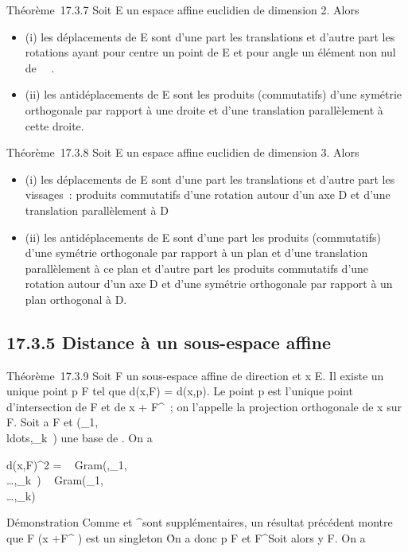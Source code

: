 \documentclass[]{article}
\begin{document}
Théorème~17.3.7 Soit E un espace affine euclidien de dimension 2. Alors

\begin{itemize}
\itemsep1pt\parskip0pt
\item
  (i) les déplacements de E sont d'une part les translations et d'autre
  part les rotations ayant pour centre un point de E et pour angle un
  élément non nul de ~\pi~.
\item
  (ii) les antidéplacements de E sont les produits (commutatifs) d'une
  symétrie orthogonale par rapport à une droite et d'une translation
  parallèlement à cette droite.
\end{itemize}

Théorème~17.3.8 Soit E un espace affine euclidien de dimension 3. Alors

\begin{itemize}
\itemsep1pt\parskip0pt
\item
  (i) les déplacements de E sont d'une part les translations et d'autre
  part les vissages~: produits commutatifs d'une rotation autour d'un
  axe D et d'une translation parallèlement à D
\item
  (ii) les antidéplacements de E sont d'une part les produits
  (commutatifs) d'une symétrie orthogonale par rapport à un plan et
  d'une translation parallèlement à ce plan et d'autre part les produits
  commutatifs d'une rotation autour d'un axe D et d'une symétrie
  orthogonale par rapport à un plan orthogonal à D.
\end{itemize}

\subsection{17.3.5 Distance à un sous-espace affine}

Théorème~17.3.9 Soit F un sous-espace affine de direction
\overrightarrowF et x \in E. Il existe un unique point
p \in F tel que d(x,F) = d(x,p). Le point p est l'unique point
d'intersection de F et de x +\overrightarrow
F^\bot~; on l'appelle la projection orthogonale de x sur F.
Soit a \in F et
(\vece_1,\\ldots,\vece_k~)
une base de \overrightarrowF. On a

d(x,F)^2 =
~
Gram(\overrightarrowax,\vece_1,\\\ldots,\vece_k~)
\over
{}~
Gram(\vece_1,\\\ldots,\vece_k)~

Démonstration Comme \overrightarrowF et
\overrightarrowF^\bot sont supplémentaires,
un résultat précédent montre que F \bigcap\left (x
+\overrightarrow F^\bot\right
) est un singleton \p\. On a donc p \in
F et \overrightarrowxp
\in\overrightarrow F^\bot Soit alors y \in F. On
a
\end{document}
